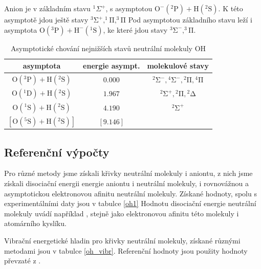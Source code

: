  Anion je v základním stavu $^1\Sigma^+$, s asymptotou
  $\mathrm{O^-}(^2\mathrm{P}) + \mathrm{H}(^2\mathrm{S})$. 
  K této asymptotě jdou ještě stavy
  $\mathrm{^3\Sigma^+,^1\Pi, ^3\Pi}$
 Pod asymptotou základního stavu leží i asymptota 
 $\mathrm{O}(^3\mathrm{P}) + \mathrm{H^-}(^1\mathrm{S})$, 
 ke které jdou stavy $\mathrm{^3\Sigma^-, ^3\Pi}$.

\begin{table}
\centering
\caption{Asymptotické chování nejnižších stavů neutrální molekuly OH}
\label{taOHas}
\bigskip
\begin{tabular}{ccc}
\toprule
asymptota & energie asympt. & molekulové stavy \\ 
\midrule
$\mathrm{O}(^3\mathrm{P}) + \mathrm{H}(^2\mathrm{S})$ & $0.000$ & $\mathrm{^2\Sigma^-}, \mathrm{^4\Sigma^-},\mathrm{^2\Pi},\mathrm{^4\Pi}$ \\ 
$\mathrm{O}(^1\mathrm{D}) + \mathrm{H}(^2\mathrm{S})$ & $1.967$ & $\mathrm{^2\Sigma^+}, \mathrm{^2\Pi}, \mathrm{^2\Delta}$ \\ 
$\mathrm{O}(^1\mathrm{S}) + \mathrm{H}(^2\mathrm{S})$ & $4.190$ & $ \mathrm{^2\Sigma^+}$ \\ 
$[\mathrm{O}(^5\mathrm{S}) + \mathrm{H}(^2\mathrm{S})]$ & $[9.146]$ \\ 
\bottomrule
\end{tabular} 
\end{table}

\subsection{Referenční výpočty}
Pro různé metody jsme získali křivky neutrální molekuly i aniontu, z nich jsme získali
disociační energii energie aniontu i neutrální molekuly, i rovnovážnou a asymptotickou 
elektronovou afinitu neutrální molekuly. Získané hodnoty, spolu s experimentálními daty 
jsou v tabulce \ref{oh1}
Hodnotu disociační energie neutrální molekuly uvádí například \cite{CRC_Handbook90}, 
stejně jako elektronovou afinitu této molekuly i atomárního kyslíku.

Vibrační energetické hladin pro křivky neutrální molekuly, získané různými metodami 
jsou v tabulce \ref{oh_vibr}. Referenční hodnoty jsou použity hodnoty převzaté z 
\cite{OH_vibr}.

